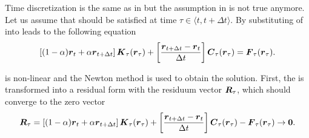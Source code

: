 Time discretization is the same as in  but the assumption in  is not true anymore. Let us assume that  should be satisfied at time $\tau\in\langle t,t+\Delta t \rangle$. By substituting of  into  leads to the following equation
\begin{equation}
\left[(1-\alpha)\mbox{\boldmath$r$}_t + \alpha\mbox{\boldmath$r$}_{t+\Delta t} \right] \mbox{\boldmath$K$}_{\tau}(\mbox{\boldmath$r$}_\tau) +
\left[\mbox{$\displaystyle\frac{\mbox{\boldmath$r$}_{t+\Delta t}-\mbox{\boldmath$r$}_t}{\Delta t}$}\right] \mbox{\boldmath$C$}_{\tau}(\mbox{\boldmath$r$}_\tau) = 
\mbox{\boldmath$F$}_{\tau}(\mbox{\boldmath$r$}_\tau).\label{NonNonTrans:5}
\end{equation}

 is non-linear and the Newton method is used to obtain the solution. First, the  is 
transformed into a residual form with the residuum vector $\mbox{\boldmath$R$}_{\tau}$, which should converge to the zero vector
\begin{equation}
\mbox{\boldmath$R$}_{\tau} = 
\left[(1-\alpha)\mbox{\boldmath$r$}_t + \alpha\mbox{\boldmath$r$}_{t+\Delta t} \right] \mbox{\boldmath$K$}_{\tau}(\mbox{\boldmath$r$}_\tau) +
\left[\mbox{$\displaystyle\frac{\mbox{\boldmath$r$}_{t+\Delta t}-\mbox{\boldmath$r$}_t}{\Delta t}$}\right] \mbox{\boldmath$C$}_{\tau}(\mbox{\boldmath$r$}_\tau) -
\mbox{\boldmath$F$}_{\tau}(\mbox{\boldmath$r$}_\tau) \to \mbox{\boldmath$0$}.\label{NonNonTrans:6}
\end{equation}

